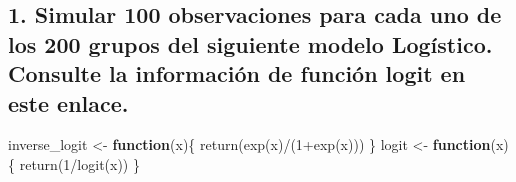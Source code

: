 \documentclass[
]{article}
\newenvironment{Shaded}{\begin{snugshade}}{\end{snugshade}}
\newcommand{\ControlFlowTok}[1]{\textcolor[rgb]{0.13,0.29,0.53}{\textbf{#1}}}
\newcommand{\DecValTok}[1]{\textcolor[rgb]{0.00,0.00,0.81}{#1}}
\newcommand{\FunctionTok}[1]{\textcolor[rgb]{0.00,0.00,0.00}{#1}}
\newcommand{\NormalTok}[1]{#1}
\newcommand{\OtherTok}[1]{\textcolor[rgb]{0.56,0.35,0.01}{#1}}
\newcommand{\SpecialCharTok}[1]{\textcolor[rgb]{0.00,0.00,0.00}{#1}}
\begin{document}
\hypertarget{simular-100-observaciones-para-cada-uno-de-los-200-grupos-del-siguiente-modelo-loguxedstico.-consulte-la-informaciuxf3n-de-funciuxf3n-logit-en-este-enlace.}{%
\subsection{1. Simular 100 observaciones para cada uno de los 200 grupos
del siguiente modelo Logístico. Consulte la información de función logit
en este
enlace.}\label{simular-100-observaciones-para-cada-uno-de-los-200-grupos-del-siguiente-modelo-loguxedstico.-consulte-la-informaciuxf3n-de-funciuxf3n-logit-en-este-enlace.}}

\begin{Shaded}
\begin{Highlighting}[]
\NormalTok{inverse\_logit }\OtherTok{\textless{}{-}} \ControlFlowTok{function}\NormalTok{(x)\{}
  \FunctionTok{return}\NormalTok{(}\FunctionTok{exp}\NormalTok{(x)}\SpecialCharTok{/}\NormalTok{(}\DecValTok{1}\SpecialCharTok{+}\FunctionTok{exp}\NormalTok{(x)))}
\NormalTok{\}}
\NormalTok{logit }\OtherTok{\textless{}{-}} \ControlFlowTok{function}\NormalTok{(x)\{}
  \FunctionTok{return}\NormalTok{(}\DecValTok{1}\SpecialCharTok{/}\FunctionTok{logit}\NormalTok{(x))}
\NormalTok{\}}
\end{Highlighting}
\end{Shaded}
\end{document}
